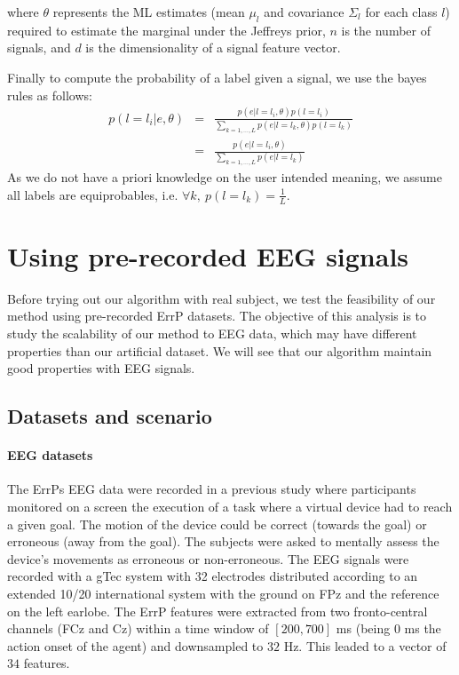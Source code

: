 where $\theta$ represents the ML estimates (mean $\mu_l$ and covariance $\Sigma_l$ for each class $l$) required to estimate the marginal under the Jeffreys prior, $n$ is the number of signals, and $d$ is the dimensionality of a signal feature vector.

Finally to compute the probability of a label given a signal, we use the bayes rules as follows:
%
\begin{eqnarray}
    p(l = l_i|e,\theta) &=& \frac{p(e|l = l_i, \theta)p(l = l_i)}{\sum_{k = 1,\ldots, L}{p(e|l = l_k,\theta)p(l = l_k)}}\nonumber \\
    &=& \frac{p(e|l=l_i, \theta)}{\sum_{k = 1,\ldots, L} p(e|l=l_k)} \nonumber
\end{eqnarray}
%
As we do not have a priori knowledge on the user intended meaning, we assume all labels are equiprobables, i.e. $\forall k,~p(l = l_k) = \frac{1}{L}$.

\section{Using pre-recorded EEG signals}
\label{chapter:bci:EEGsignals}

Before trying out our algorithm with real subject, we test the feasibility of our method using pre-recorded ErrP datasets. The objective of this analysis is to study the scalability of our method to EEG data, which may have different properties than our artificial dataset. We will see that our algorithm maintain good properties with EEG signals.

\subsection{Datasets and scenario}

\paragraph{EEG datasets}  The ErrPs EEG data were recorded in a previous study \cite{iturrate2013task} where participants monitored on a screen the execution of a task where a virtual device had to reach a given goal. The motion of the device could be correct (towards the goal) or erroneous (away from the goal). The subjects were asked to mentally assess the device's movements as erroneous or non-erroneous. The EEG signals were recorded with a gTec system with 32 electrodes distributed according to an extended 10/20 international system with the ground on FPz and the reference on the left earlobe. The ErrP features were extracted from two fronto-central channels (FCz and Cz) within a time window of $[200,700]$ ms (being 0 ms the action onset of the agent) and downsampled to $32$ Hz. This leaded to a vector of $34$ features.

